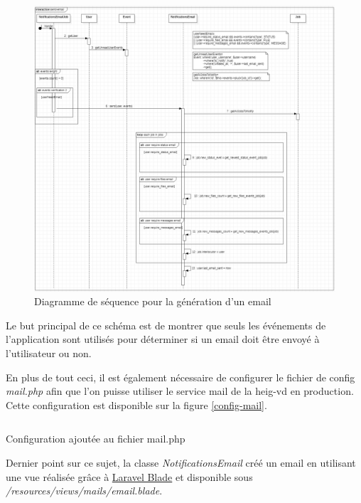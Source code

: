 \documentclass[
    iai, %
    il, %
]{heig-tb}
\begin{document}
\begin{center}
    \begin{figure}
        \includegraphics[width=\textwidth]{./assets/figures/emails-events-sequence.png}
        \caption{Diagramme de séquence pour la génération d'un email \label{events-email-sequence}}
    \end{figure}
\end{center}

Le but principal de ce schéma est de montrer que seuls les événements de l'application sont utilisés pour déterminer si un email doit être envoyé à l'utilisateur ou non.

En plus de tout ceci, il est également nécessaire de configurer le fichier de config \emph{mail.php} afin que l'on puisse utiliser le service mail de la \Gls{heig-vd} en production. Cette configuration est disponible sur la figure \ref{config-mail}.

\begin{listing}[h]
    \inputminted{php}{assets/code/mail.php}
    \caption{Configuration ajoutée au fichier mail.php \label{config-mail}}
\end{listing}

Dernier point sur ce sujet, la classe \emph{NotificationsEmail} créé un email en utilisant une vue réalisée grâce à \href{https://laravel.com/docs/9.x/blade}{Laravel Blade} et disponible sous \emph{/resources/views/mails/email.blade}.
\end{document}
